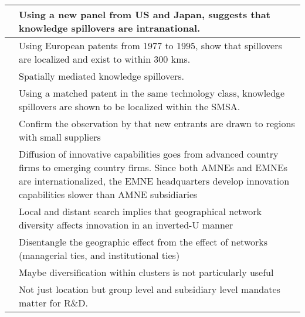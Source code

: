 \documentclass[12pt]{article}
\begin{document}
\begin{center}
\begin{longtable}{|p{}|p{}|}
\cite*{Branstetter2001}&Using a new panel from US and Japan, suggests that knowledge spillovers are intranational.\\\hline
\cite*{Bottazzi2003}&Using European patents from 1977 to 1995, show that spillovers are localized and exist to within 300 kms.\\\hline

\cite*{Jaffe1989} &Spatially mediated knowledge spillovers.\\\hline
\cite*{Jaffe1993}&Using a matched patent in the same technology class, knowledge spillovers are shown to be localized within the SMSA.\\\hline
\cite*{Glaeser2009} & Confirm the observation by \cite*{Chinitz1961} that new entrants are drawn to regions with small suppliers \\\hline


\cite*{Awate2015} & Diffusion of innovative capabilities goes from advanced country firms to emerging country firms. Since both AMNEs and EMNEs are internationalized, the EMNE headquarters develop innovation capabilities slower than AMNE subsidiaries\\\hline

\cite*{Bahlmann2014} & Local and distant search implies that geographical network diversity affects innovation in an inverted-U manner\\\hline

\cite*{Bell2005} & Disentangle the geographic effect from the effect of networks (managerial ties, and institutional ties)\\\hline

\cite*{Baptista1998} & Maybe diversification within clusters is not particularly useful\\\hline

\cite*{Cantwell2005} & Not just location but group level and subsidiary level mandates matter for R\&D.\\\hline



\end{longtable}
\end{center}
\end{document}
